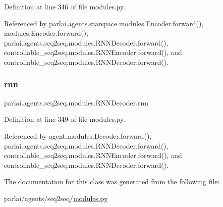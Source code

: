 Definition at line 346 of file modules.\+py.



Referenced by parlai.\+agents.\+starspace.\+modules.\+Encoder.\+forward(), modules.\+Encoder.\+forward(), parlai.\+agents.\+seq2seq.\+modules.\+R\+N\+N\+Decoder.\+forward(), controllable\+\_\+seq2seq.\+modules.\+R\+N\+N\+Encoder.\+forward(), and controllable\+\_\+seq2seq.\+modules.\+R\+N\+N\+Decoder.\+forward().

\mbox{\label{classparlai_1_1agents_1_1seq2seq_1_1modules_1_1RNNDecoder_ace209ab9eab09c06a356da8daca8ce3c}} 
\subsubsection{\texorpdfstring{rnn}{rnn}}
{\footnotesize\ttfamily parlai.\+agents.\+seq2seq.\+modules.\+R\+N\+N\+Decoder.\+rnn}



Definition at line 349 of file modules.\+py.



Referenced by agent.\+modules.\+Decoder.\+forward(), parlai.\+agents.\+seq2seq.\+modules.\+R\+N\+N\+Decoder.\+forward(), controllable\+\_\+seq2seq.\+modules.\+R\+N\+N\+Encoder.\+forward(), and controllable\+\_\+seq2seq.\+modules.\+R\+N\+N\+Decoder.\+forward().



The documentation for this class was generated from the following file\+:\begin{DoxyCompactItemize}
\item 
parlai/agents/seq2seq/\hyperlink{parlai_2agents_2seq2seq_2modules_8py}{modules.\+py}\end{DoxyCompactItemize}
